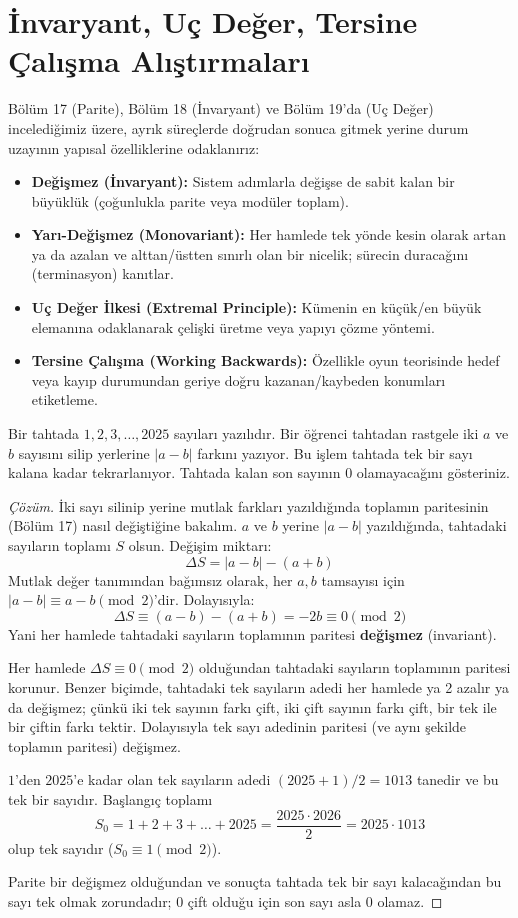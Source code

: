 \section{İnvaryant, Uç Değer, Tersine Çalışma Alıştırmaları}

Bölüm 17 (Parite), Bölüm 18 (İnvaryant) ve Bölüm 19'da (Uç Değer) incelediğimiz üzere, ayrık süreçlerde doğrudan sonuca gitmek yerine durum uzayının yapısal özelliklerine odaklanırız:
\begin{itemize}
    \item \textbf{Değişmez (İnvaryant):} Sistem adımlarla değişse de sabit kalan bir büyüklük (çoğunlukla parite veya modüler toplam).
    \item \textbf{Yarı-Değişmez (Monovariant):} Her hamlede tek yönde kesin olarak artan ya da azalan ve alttan/üstten sınırlı olan bir nicelik; sürecin duracağını (terminasyon) kanıtlar.
    \item \textbf{Uç Değer İlkesi (Extremal Principle):} Kümenin en küçük/en büyük elemanına odaklanarak çelişki üretme veya yapıyı çözme yöntemi.
    \item \textbf{Tersine Çalışma (Working Backwards):} Özellikle oyun teorisinde hedef veya kayıp durumundan geriye doğru kazanan/kaybeden konumları etiketleme.
\end{itemize}

\begin{example}
Bir tahtada $1, 2, 3, \dots, 2025$ sayıları yazılıdır. Bir öğrenci tahtadan rastgele iki $a$ ve $b$ sayısını silip yerlerine $|a - b|$ farkını yazıyor. Bu işlem tahtada tek bir sayı kalana kadar tekrarlanıyor. Tahtada kalan son sayının $0$ olamayacağını gösteriniz.
\end{example}

\begin{proof}[Çözüm]
İki sayı silinip yerine mutlak farkları yazıldığında toplamın paritesinin (Bölüm 17) nasıl değiştiğine bakalım.
$a$ ve $b$ yerine $|a - b|$ yazıldığında, tahtadaki sayıların toplamı $S$ olsun. Değişim miktarı:
\[
\Delta S = |a - b| - (a + b)
\]
Mutlak değer tanımından bağımsız olarak, her $a, b$ tamsayısı için $|a - b| \equiv a - b \pmod 2$'dir.
Dolayısıyla:
\[
\Delta S \equiv (a - b) - (a + b) = -2b \equiv 0 \pmod 2
\]
Yani her hamlede tahtadaki sayıların toplamının paritesi \textbf{değişmez} (invariant).

Her hamlede $\Delta S \equiv 0 \pmod 2$ olduğundan tahtadaki sayıların toplamının paritesi korunur. Benzer biçimde, tahtadaki tek sayıların adedi her hamlede ya 2 azalır ya da değişmez; çünkü iki tek sayının farkı çift, iki çift sayının farkı çift, bir tek ile bir çiftin farkı tektir. Dolayısıyla tek sayı adedinin paritesi (ve aynı şekilde toplamın paritesi) değişmez.

$1$'den $2025$'e kadar olan tek sayıların adedi $(2025+1)/2 = 1013$ tanedir ve bu tek bir sayıdır. Başlangıç toplamı
\[
S_0 = 1 + 2 + 3 + \dots + 2025 = \frac{2025 \cdot 2026}{2} = 2025 \cdot 1013
\]
olup tek sayıdır ($S_0 \equiv 1 \pmod 2$).

Parite bir değişmez olduğundan ve sonuçta tahtada tek bir sayı kalacağından bu sayı tek olmak zorundadır; $0$ çift olduğu için son sayı asla $0$ olamaz.
\end{proof}

